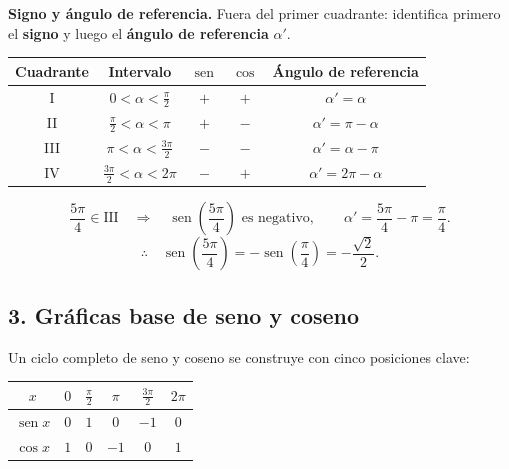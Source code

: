 \documentclass[12pt,letterpaper]{article}
\providecommand{\sen}{\operatorname{sen}}
\begin{document}
\noindent
\begin{minipage}{\textwidth}
\textbf{Signo y ángulo de referencia.}
Fuera del primer cuadrante: identifica primero el \textbf{signo} y luego el \textbf{ángulo de referencia} $\alpha'$.

\begin{center}
\renewcommand{\arraystretch}{1.05}
\small
\begin{tabular}{ccccc}
\toprule
Cuadrante & Intervalo & $\sen$ & $\cos$ & Ángulo de referencia \\
\midrule
I & $0<\alpha<\frac{\pi}{2}$ & $+$ & $+$ & $\alpha'=\alpha$ \\
II & $\frac{\pi}{2}<\alpha<\pi$ & $+$ & $-$ & $\alpha'=\pi-\alpha$ \\
III & $\pi<\alpha<\frac{3\pi}{2}$ & $-$ & $-$ & $\alpha'=\alpha-\pi$ \\
IV & $\frac{3\pi}{2}<\alpha<2\pi$ & $-$ & $+$ & $\alpha'=2\pi-\alpha$ \\
\bottomrule
\end{tabular}
\normalsize
\end{center}
\vspace{-0.15cm}

\begin{ejemplobox}
\small
\[
\frac{5\pi}{4}\in\text{III}
\quad\Longrightarrow\quad
\sen\left(\frac{5\pi}{4}\right)\text{ es negativo},
\qquad
\alpha'=\frac{5\pi}{4}-\pi=\frac{\pi}{4}.
\]
\vspace{-0.2cm}
\[
\therefore\quad
\sen\left(\frac{5\pi}{4}\right)
=-\sen\left(\frac{\pi}{4}\right)
=-\frac{\sqrt2}{2}.
\]
\normalsize
\end{ejemplobox}
\end{minipage}
\endgroup

\subsection{3. Gráficas base de seno y coseno}

Un ciclo completo de seno y coseno se construye con cinco posiciones clave:

\begin{center}
\renewcommand{\arraystretch}{1.5}
\begin{tabular}{c|ccccc}
\toprule
$x$ & $0$ & $\frac{\pi}{2}$ & $\pi$ & $\frac{3\pi}{2}$ & $2\pi$ \\
\midrule
$\sen x$ & $0$ & $1$ & $0$ & $-1$ & $0$ \\
$\cos x$ & $1$ & $0$ & $-1$ & $0$ & $1$ \\
\bottomrule
\end{tabular}
\end{center}
\end{document}
